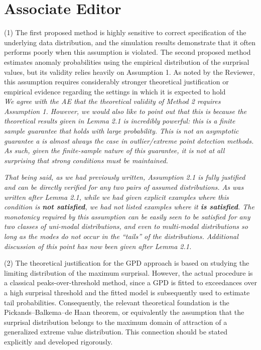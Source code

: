 \documentclass[a4paper,11pt]{article}
\begin{document}
\section{Associate Editor}

\noindent(1) The first proposed method is highly sensitive to correct specification of the underlying data distribution, and the simulation results demonstrate that it often performs poorly when this assumption is violated. The second proposed method estimates anomaly probabilities using the empirical distribution of the surprisal values, but its validity relies heavily on Assumption 1.  As noted by the Reviewer, this assumption requires considerably stronger theoretical justification or empirical evidence regarding the settings in which it is expected to hold\\

\noindent\textit{We agree with the AE that the theoretical validity of Method 2 requires Assumption 1. However, we would also like to point out that this is because the theoretical results given in Lemma 2.1 is incredibly powerful: this is a finite sample guarantee that holds with large probability. This is not an asymptotic guarantee a is almost always the case in outlier/extreme point detection methods. As such, given the finite-sample nature of this guarantee, it is not at all surprising that strong conditions must be maintained.  }

\noindent\textit{That being said, as we had previously written, Assumption 2.1 is fully justified and can be directly verified for any two pairs of assumed distributions. As was written after Lemma 2.1, while we had given explicit examples where this condition is \textbf{not satisfied}, we had not listed examples where it \textbf{is satisfied}. The monotonicy required by this assumption can be easily seen to be satisfied for any two classes of uni-modal distributions, and even to multi-modal distributions so long as the modes do not occur in the ``tails'' of the distributions. Additional discussion of this point has now been given after Lemma 2.1.}

\noindent (2) The theoretical justification for the GPD approach is based on studying the limiting distribution of the maximum surprisal. However, the actual procedure is a classical peaks-over-threshold method, since a GPD is fitted to exceedances over a high surprisal threshold and the fitted model is subsequently used to estimate tail probabilities. Consequently, the relevant theoretical foundation is the Pickands–Balkema–de Haan theorem, or equivalently the assumption that the surprisal distribution belongs to the maximum domain of attraction of a generalized extreme value distribution. This connection should be stated explicitly and developed rigorously.\\
\end{document}

